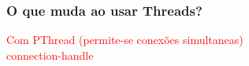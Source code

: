 \documentclass[10pt, xcolor=x11names]{beamer}
\begin{document}
\begin{frame}\frametitle{O que muda ao usar Threads?}
	\textcolor{red}{Com PThread (permite-se conexões simultaneas)}\\
	\textcolor{red}{connection-handle}\\
		
\end{frame}
\end{document}
